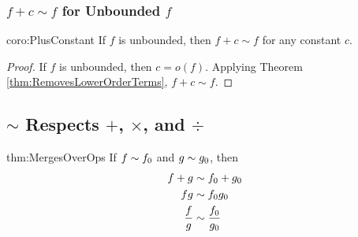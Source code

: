 \subsubsection{$f + c \sim f$ for Unbounded $f$}

\begin{repcorollary}{coro:PlusConstant}
	If $f$ is unbounded, then $f + c \sim f$ for any constant $c$.
\end{repcorollary}

\begin{proof}
	If $f$ is unbounded, then $c = o(f)$. Applying Theorem \ref{thm:RemovesLowerOrderTerms}, $f + c \sim f$.
\end{proof}

\subsection{$\sim$ Respects $+$, $\times$, and $\div$}

\begin{reptheorem}{thm:MergesOverOps}
	If $f \sim f_0$ and $g \sim g_0$, then
	\begin{align*}
	f + g &\sim f_0 + g_0\\
	fg &\sim f_0g_0\\
	\frac{f}{g} &\sim \frac {f_0} {g_0}
	\end{align*}
\end{reptheorem}

